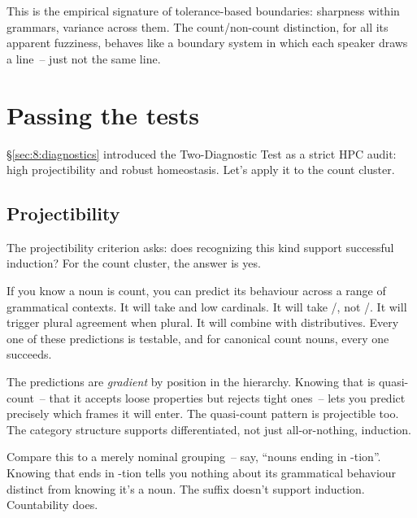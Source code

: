 This is the empirical signature of tolerance-based boundaries: sharpness within grammars, variance across them. The count/non-count distinction, for all its apparent fuzziness, behaves like a boundary system in which each speaker draws a line~-- just not the same line.

\section{Passing the tests}
\label{sec:9:passing-tests}

§\ref{sec:8:diagnostics} introduced the Two-Diagnostic Test as a strict HPC audit: high projectibility and robust homeostasis. Let's apply it to the count cluster.

\subsection{Projectibility}
\label{sec:9:projectibility}

The projectibility criterion asks: does recognizing this kind support successful induction? For the count cluster, the answer is yes.

If you know a noun is count, you can predict its behaviour across a range of grammatical contexts. It will take  and low cardinals. It will take /, not /. It will trigger plural agreement when plural. It will combine with distributives. Every one of these predictions is testable, and for canonical count nouns, every one succeeds.

The predictions are \emph{gradient} by position in the hierarchy. Knowing that  is quasi-count~-- that it accepts loose properties but rejects tight ones~-- lets you predict precisely which frames it will enter. The quasi-count pattern is projectible too. The category structure supports differentiated, not just all-or-nothing, induction.

Compare this to a merely nominal grouping~-- say, \enquote{nouns ending in -tion}. Knowing that  ends in -tion tells you nothing about its grammatical behaviour distinct from knowing it's a noun. The suffix doesn't support induction. Countability does.

